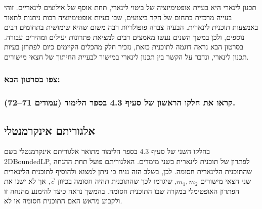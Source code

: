 \documentclass[
]{book}
\begin{document}
תכנון לינארי היא בעיית אופטימיזציה של ביטוי לינארי, תחת אוסף של אילוצים לינאריים. זוהי בעייה מרכזית בתחום של חקר ביצועים, שבו בעיות אופטימיזציה רבות ניתנות לתאור באמצעות תוכנית לינארית. הבעיה צברה פופולריות רבה משום שהיא שימושית בתחומים רבים נוספים, ולכן במשך השנים נעשו מאמצים רבים למציאת פתרונות יעילים ומהירים עבורה. בסרטון הבא נראה דוגמה לתוכנית כזאת, נזכיר חלק מהכלים הקיימים כיום לפתרון בעיות תכנון לינארי, ונדבר על הקשר בין תכנון לינארי במישור לבעיית החיתוך של חצאי מישורים.

\hypertarget{ux5e6ux5e4ux5d5-ux5d1ux5e1ux5e8ux5d8ux5d5ux5df-ux5d4ux5d1ux5d0-3}{%
\subsubsection*{צפו בסרטון הבא:}\label{ux5e6ux5e4ux5d5-ux5d1ux5e1ux5e8ux5d8ux5d5ux5df-ux5d4ux5d1ux5d0-3}}

\hypertarget{ux5e7ux5e8ux5d0ux5d5-ux5d0ux5ea-ux5d7ux5dcux5e7ux5d5-ux5d4ux5e8ux5d0ux5e9ux5d5ux5df-ux5e9ux5dc-ux5e1ux5e2ux5d9ux5e3-4.3-ux5d1ux5e1ux5e4ux5e8-ux5d4ux5dcux5d9ux5deux5d5ux5d3-ux5e2ux5deux5d5ux5d3ux5d9ux5dd-7172.}{%
\subsubsection*{קראו את חלקו הראשון של סעיף 4.3 בספר הלימוד (עמודים 71--72).}\label{ux5e7ux5e8ux5d0ux5d5-ux5d0ux5ea-ux5d7ux5dcux5e7ux5d5-ux5d4ux5e8ux5d0ux5e9ux5d5ux5df-ux5e9ux5dc-ux5e1ux5e2ux5d9ux5e3-4.3-ux5d1ux5e1ux5e4ux5e8-ux5d4ux5dcux5d9ux5deux5d5ux5d3-ux5e2ux5deux5d5ux5d3ux5d9ux5dd-7172.}}

\hypertarget{ux5d0ux5dcux5d2ux5d5ux5e8ux5d9ux5eaux5dd-ux5d0ux5d9ux5e0ux5e7ux5e8ux5deux5e0ux5d8ux5dcux5d9}{%
\subsection{אלגוריתם אינקרמנטלי}\label{ux5d0ux5dcux5d2ux5d5ux5e8ux5d9ux5eaux5dd-ux5d0ux5d9ux5e0ux5e7ux5e8ux5deux5e0ux5d8ux5dcux5d9}}

בחלקו השני של סעיף 4.3 בספר הלימוד מתואר אלגוריתם אינקרמנטלי בשם 2DBoundedLP, לפתרון של תוכנית לינארית בשני מימדים. האלגוריתם פועל תחת ההנחה שהתוכנית הלינארית חסומה. לכן, בשלב הזה נניח כי ניתן למצוא ולהוסיף לתוכנית הלינארית שני חצאי מישורים \(m_1, m_2\), שיגרמו לכך שהתוכנית תהיה חסומה בכיוון \(\overrightarrow{c}\), אך לא ישנו את הפתרון האופטימלי במקרה שבו התוכנית חסומה. בהמשך נראה כיצד להימנע מהנחה זו ולקבוע מראש האם התוכנית חסומה או לא.
\end{document}
